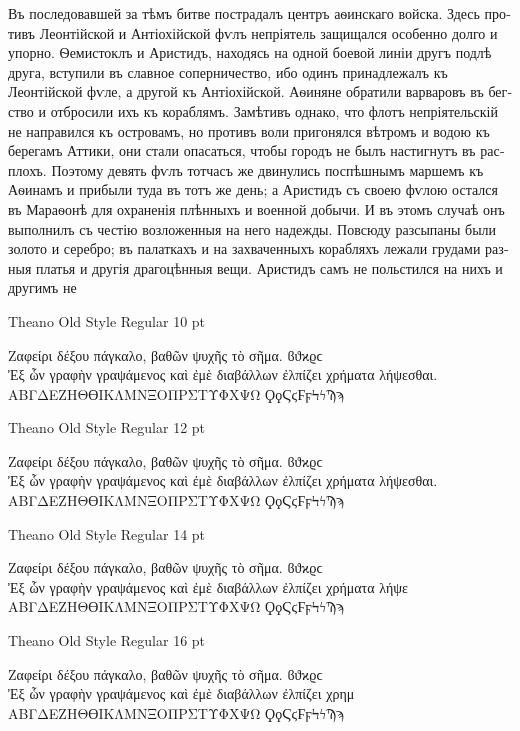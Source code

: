\documentclass[12pt,a4paper,openany]{article}
\newcommand{\pageheader}[1]{%
	\clearpage
	\pagestyle{fancy}
	\lhead{\LARGE\bfseries#1}
	\cfoot{}
}
\newcommand{\sampletitle}[1]{%
        \addvspace{\bigskipamount}
        \noindent#1
        \smallskip
}
\begin{document}
\begin{otherlanguage}{russian}
\parfillskip=0pt
\fontsize{14}{18}\selectfont

\noindent Въ последовавшей за тѣмъ битве пострадалъ центръ аѳинскаго
войска. Здесь противъ Леонтійской и Антіохійской фѵлъ непріятель
защищался особенно долго и упорно. Ѳемистоклъ и Аристидъ, находясь на
одной боевой линіи другъ подлѣ друга, вступили въ славное соперничество,
ибо одинъ принадлежалъ къ Леонтійской фѵле, а другой къ Антіохійской.
Аѳиняне обратили варваровъ въ бегство и отбросили ихъ къ кораблямъ. Замѣтивъ
однако, что флотъ непріятельскій не направился къ островамъ, но противъ
воли пригонялся вѣтромъ и водою къ берегамъ Аттики, они стали опасаться,
чтобы городъ не былъ настигнутъ въ расплохъ. Поэтому девять фѵлъ тотчасъ
же двинулись поспѣшнымъ маршемъ къ Аѳинамъ и прибыли туда въ тотъ же день;
а Аристидъ съ своею фѵлою остался въ Мараѳонѣ для охраненія плѣнныхъ и
военной добычи. И въ этомъ случаѣ онъ выполнилъ съ честію возложенныя на
него надежды. Повсюду разсыпаны были золото и серебро; въ палаткахъ и на
захваченныхъ корабляхъ лежали грудами разныя платья и другія драгоцѣнныя
вещи. Аристидъ самъ не польстился на нихъ и другимъ не

\end{otherlanguage}

\pageheader{Theano Old Style~--- Greek Characters}

\hspace\parindent\begin{minipage}[t]{\dimexpr\textwidth-\parindent\relax}

\sampletitle{Theano Old Style Regular 10 pt}

{\fontsize{10}{12}\selectfont\noindent
Ζαφείρι δέξου πάγκαλο, βαθῶν ψυχῆς τὸ σῆμα. ϐϑϰϱϲ\\
Ἐξ ὧν γραφὴν γραψάμενος καὶ ἐμὲ διαβάλλων ἐλπίζει χρήματα λήψεσθαι.\\
ΑΒΓΔΕΖΗΘϴΙΚΛΜΝΞΟΠΡΣΤΥΦΧΨΩ ϘϙϚϛϜϝϞϟϠϡ
}

\sampletitle{Theano Old Style Regular 12 pt}

{\fontsize{12}{14}\selectfont\noindent
Ζαφείρι δέξου πάγκαλο, βαθῶν ψυχῆς τὸ σῆμα. ϐϑϰϱϲ\\
Ἐξ ὧν γραφὴν γραψάμενος καὶ ἐμὲ διαβάλλων ἐλπίζει χρήματα λήψεσθαι.\\
ΑΒΓΔΕΖΗΘϴΙΚΛΜΝΞΟΠΡΣΤΥΦΧΨΩ ϘϙϚϛϜϝϞϟϠϡ
}

\sampletitle{Theano Old Style Regular 14 pt}

{\fontsize{14}{18}\selectfont\noindent
Ζαφείρι δέξου πάγκαλο, βαθῶν ψυχῆς τὸ σῆμα. ϐϑϰϱϲ\\
Ἐξ ὧν γραφὴν γραψάμενος καὶ ἐμὲ διαβάλλων ἐλπίζει χρήματα λήψε\\
ΑΒΓΔΕΖΗΘϴΙΚΛΜΝΞΟΠΡΣΤΥΦΧΨΩ ϘϙϚϛϜϝϞϟϠϡ
}

\sampletitle{Theano Old Style Regular 16 pt}

{\fontsize{16}{20}\selectfont\noindent
Ζαφείρι δέξου πάγκαλο, βαθῶν ψυχῆς τὸ σῆμα. ϐϑϰϱϲ\\
Ἐξ ὧν γραφὴν γραψάμενος καὶ ἐμὲ διαβάλλων ἐλπίζει χρημ\\
ΑΒΓΔΕΖΗΘϴΙΚΛΜΝΞΟΠΡΣΤΥΦΧΨΩ ϘϙϚϛϜϝϞϟϠϡ
}

\end{minipage}
\end{document}
